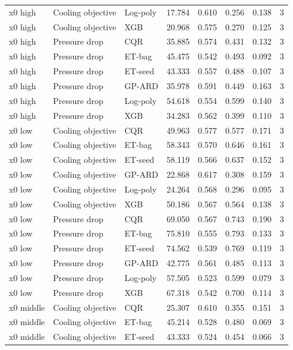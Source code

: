 \begin{longtable}{llllllll}
x0 high & Cooling objective & Log-poly & 17.784 & 0.610 & 0.256 & 0.138 & 3\\
x0 high & Cooling objective & XGB & 20.968 & 0.575 & 0.270 & 0.125 & 3\\
x0 high & Pressure drop & CQR & 35.885 & 0.574 & 0.431 & 0.132 & 3\\
x0 high & Pressure drop & ET-bag & 45.475 & 0.542 & 0.493 & 0.092 & 3\\
x0 high & Pressure drop & ET-seed & 43.333 & 0.557 & 0.488 & 0.107 & 3\\
x0 high & Pressure drop & GP-ARD & 35.978 & 0.591 & 0.449 & 0.163 & 3\\
x0 high & Pressure drop & Log-poly & 54.618 & 0.554 & 0.599 & 0.140 & 3\\
x0 high & Pressure drop & XGB & 34.283 & 0.562 & 0.399 & 0.110 & 3\\
x0 low & Cooling objective & CQR & 49.963 & 0.577 & 0.577 & 0.171 & 3\\
x0 low & Cooling objective & ET-bag & 58.343 & 0.570 & 0.646 & 0.161 & 3\\
x0 low & Cooling objective & ET-seed & 58.119 & 0.566 & 0.637 & 0.152 & 3\\
x0 low & Cooling objective & GP-ARD & 22.868 & 0.617 & 0.308 & 0.159 & 3\\
x0 low & Cooling objective & Log-poly & 24.264 & 0.568 & 0.296 & 0.095 & 3\\
x0 low & Cooling objective & XGB & 50.186 & 0.567 & 0.564 & 0.138 & 3\\
x0 low & Pressure drop & CQR & 69.050 & 0.567 & 0.743 & 0.190 & 3\\
x0 low & Pressure drop & ET-bag & 75.810 & 0.555 & 0.793 & 0.133 & 3\\
x0 low & Pressure drop & ET-seed & 74.562 & 0.539 & 0.769 & 0.119 & 3\\
x0 low & Pressure drop & GP-ARD & 42.775 & 0.561 & 0.485 & 0.113 & 3\\
x0 low & Pressure drop & Log-poly & 57.505 & 0.523 & 0.599 & 0.079 & 3\\
x0 low & Pressure drop & XGB & 67.318 & 0.542 & 0.700 & 0.114 & 3\\
x0 middle & Cooling objective & CQR & 25.307 & 0.610 & 0.355 & 0.151 & 3\\
x0 middle & Cooling objective & ET-bag & 45.214 & 0.528 & 0.480 & 0.069 & 3\\
x0 middle & Cooling objective & ET-seed & 43.333 & 0.524 & 0.454 & 0.066 & 3\\

\end{longtable}
